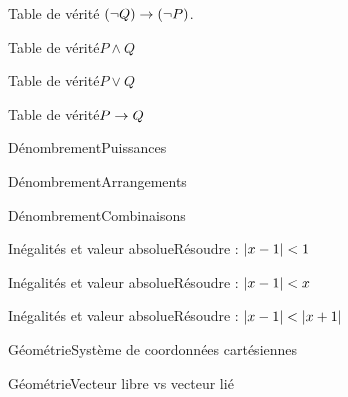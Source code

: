 \documentclass[french,t,handout,xcolor=svgnames]{beamer}
\begin{document}
\begin{frame}{Table de vérité $(\neg Q) \rightarrow (\neg P)$.}
  
\end{frame}
\begin{frame}{Table de vérité}{$P\land Q$}
  
\end{frame}
\begin{frame}{Table de vérité}{$P\lor Q$}
  
\end{frame}
\begin{frame}{Table de vérité}{$P\rightarrow Q$}
  
\end{frame}
\begin{frame}{Dénombrement}{Puissances}
  
\end{frame}
\begin{frame}{Dénombrement}{Arrangements}
  
\end{frame}
\begin{frame}{Dénombrement}{Combinaisons}
  
\end{frame}
\begin{frame}{Inégalités et valeur absolue}{Résoudre : $\left\vert x-1\right\vert < 1$}

\end{frame}
\begin{frame}{Inégalités et valeur absolue}{Résoudre : $\left\vert x-1\right\vert < x$}

\end{frame}
\begin{frame}{Inégalités et valeur absolue}{Résoudre : $\left\vert x-1\right\vert < \left\vert x+1\right\vert$}

\end{frame}
\begin{frame}{Géométrie}{Système de coordonnées cartésiennes}

\end{frame}
\begin{frame}{Géométrie}{Vecteur libre vs vecteur lié}

\end{frame}
  
  
\end{document}
